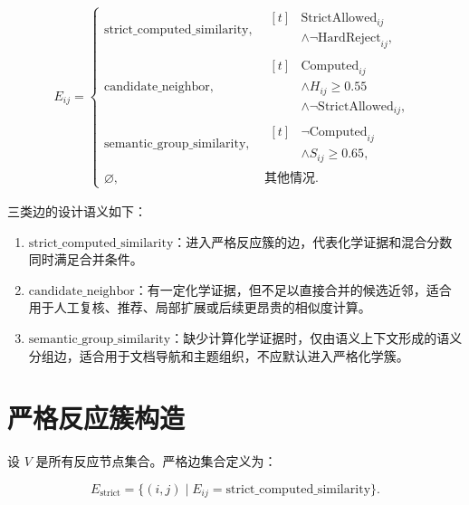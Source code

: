 \documentclass[11pt]{article}
\numberwithin{equation}{section}
\begin{document}
\begin{equation}
\begin{aligned}
E_{ij}
=
\begin{cases}
\mathrm{strict\_computed\_similarity},
& \begin{aligned}[t]
  &\mathrm{StrictAllowed}_{ij} \\
  &\land \neg\mathrm{HardReject}_{ij},
  \end{aligned} \\

\mathrm{candidate\_neighbor},
& \begin{aligned}[t]
  &\mathrm{Computed}_{ij} \\
  &\land H_{ij}\ge 0.55 \\
  &\land \neg\mathrm{StrictAllowed}_{ij},
  \end{aligned} \\

\mathrm{semantic\_group\_similarity},
& \begin{aligned}[t]
  &\neg\mathrm{Computed}_{ij} \\
  &\land S_{ij}\ge 0.65,
  \end{aligned} \\

\varnothing,
& \text{其他情况}.
\end{cases}
\end{aligned}
\end{equation}

三类边的设计语义如下：

\begin{enumerate}[label=\arabic*.]
  \item \(\mathrm{strict\_computed\_similarity}\)：进入严格反应簇的边，代表化学证据和混合分数同时满足合并条件。
  \item \(\mathrm{candidate\_neighbor}\)：有一定化学证据，但不足以直接合并的候选近邻，适合用于人工复核、推荐、局部扩展或后续更昂贵的相似度计算。
  \item \(\mathrm{semantic\_group\_similarity}\)：缺少计算化学证据时，仅由语义上下文形成的语义分组边，适合用于文档导航和主题组织，不应默认进入严格化学簇。
\end{enumerate}

\section{严格反应簇构造}

设 \(V\) 是所有反应节点集合。严格边集合定义为：

\begin{equation}
E_{\mathrm{strict}}
=
\{(i,j)\mid E_{ij}=\mathrm{strict\_computed\_similarity}\}.
\end{equation}
\end{document}
